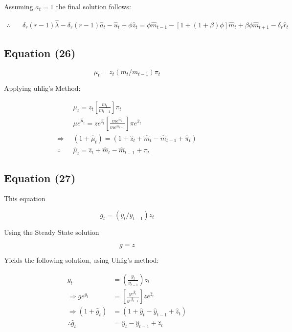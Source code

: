 \documentclass[11pt,preprint, authoryear]{elsarticle}
\numberwithin{equation}{section}
\numberwithin{figure}{section}
\numberwithin{table}{section}
\begin{document}
Assuming \(a_t = 1\) the final solution follows:

\[\begin{aligned}\therefore \quad & \delta_r (r-1) \hat{\lambda} - \delta_r(r-1) \hat{a}_t -\hat{u}_{t} +\phi \hat{z}_{t}
= \phi \hat{m}_{t-1}-[1+(1+\beta) \phi] \hat{m}_{t}+\beta \phi \hat{m}_{t+1}-\delta_{r} \hat{r}_{t}
\end{aligned}\]

\hypertarget{equation-26}{%
\subsection{Equation (26)}\label{equation-26}}

\[\mu_{t}=z_{t}\left(m_{t} / m_{t-1}\right) \pi_{t}\]

Applying uhlig's Method:

\[\begin{aligned}
&\mu_{t} =z_{t}\left[\frac{m_{t}}{m_{t-1}}\right] \pi_{t} \\
&\mu e^{\hat{\mu}_{t}}=z e^{\hat{z_{t}}}\left[\frac{m e^{\hat{m}_{t}}}{m e^{\hat{m}_{t-1}}}\right] \pi e^{\hat{\pi}_{t}} \\
\Rightarrow & \left(1+\hat{\mu}_{t}\right) =\left(1+\hat{z}_{t}+\hat{m}_{t}-\hat{m}_{t-1}+\hat{\pi}_{t}\right) \\
\therefore \quad & \hat{\mu}_{t} =\hat{z}_{t}+\hat{m}_{t}-\hat{m}_{t-1}+\pi_{t}
\end{aligned}\]

\hypertarget{equation-27}{%
\subsection{Equation (27)}\label{equation-27}}

This equation

\[g_{t}=\left(y_{t} / y_{t-1}\right) z_{t}\]

Using the Steady State solution

\[g = z\]

\newpage

Yields the following solution, using Uhlig's method:

\[\begin{aligned}
g_{t}&=\left(\frac{y_{t}}{y_{t-1}}\right) z_{t}\\
\Rightarrow ge^{g_{t}}&=\left[\frac{y e^{\hat{y}_{t}}}{y e^{\hat{y}_{t-1}}}\right] z e^{\hat{z}_{t}}\\
\Rightarrow \left(1+\hat{g}_{t}\right)&=\left(1+\hat{y}_{t}-\hat{y}_{t-1}+\hat{z}_{t}\right)\\
\therefore \hat{g}_{t} &= \hat{y}_{t}-\hat{y}_{t-1}+\hat{z}_{t}
\end{aligned}\]
\end{document}
